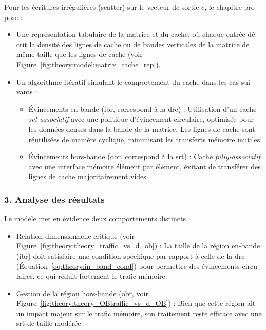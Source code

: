 \begin{otherlanguage}{french}
Pour les écritures irrégulières (\gls{scatter}) sur le vecteur de sortie $c$, le chapitre propose :
\begin{itemize}
    \item Une représentation tabulaire de la matrice et du cache, où chaque entrée décrit la densité des lignes de cache ou de bandes verticales de la matrice de même taille que les lignes de cache (voir Figure~\ref{fig:theory:model:matrix_cache_rep}).
    \item Un algorithme itératif simulant le comportement du cache dans les cas suivants :
    \begin{itemize}
        \item \'Evincements en-bande (\acrshort{ibr}, correspond à la \acrshort{drc}) : Utilisation d'un cache \textit{set-associatif} avec une politique d'évincement circulaire, optimisée pour les données denses dans la bande de la matrice.
        Les lignes de cache sont réutilisées de manière cyclique, minimisant les transferts mémoire inutiles.
        \item \'Evincements hors-bande (\acrshort{obr}, correspond à la \acrshort{srt}) : Cache \textit{fully-associatif} avec une interface mémoire élément par élément, évitant de transférer des lignes de cache majoritairement vides.
    \end{itemize}
\end{itemize}

\subsubsection*{3. Analyse des résultats}

Le modèle met en évidence deux comportements distincts :
\begin{itemize}
    \item Relation dimensionnelle critique (voir Figure~\ref{fig:theory:theory_traffic_vs_d_ob}) : La taille de la région en-bande (\acrshort{ibr}) doit satisfaire une condition spécifique par rapport à celle de la \acrshort{drc} (Équation~\ref{eq:theory:in_band_cond}) pour permettre des évincements circulaires, ce qui réduit fortement le trafic mémoire.
    \item Gestion de la région hors-bande (\acrshort{obr}, voir Figure~\ref{fig:theory:theory_OBtraffic_vs_d_OB}) : Bien que cette région ait un impact majeur sur le trafic mémoire, son traitement reste efficace avec une \acrshort{srt} de taille modérée.
\end{itemize}


\end{otherlanguage}
